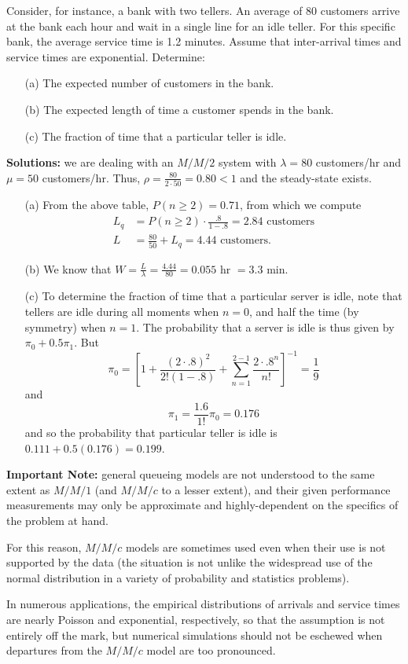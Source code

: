 \begin{Example} Consider, for instance, a bank with two tellers. An average of 80 customers arrive at the bank each hour and wait in a single line for an idle teller. For this specific bank, the average service time is 1.2 minutes. Assume that inter-arrival times and service times are exponential. Determine:
\begin{itemize}[noitemsep]
	\item[(a)] The expected number of customers in the bank.
	\item[(b)] The expected length of time a customer spends in the bank.
	\item[(c)] The fraction of time that a particular teller is idle.
\end{itemize}
\textbf{Solutions:} we are dealing with an $M/M/2$ system with $\lambda =80 $ customers/hr and $\mu = 50$ customers/hr. Thus, $\rho = \frac{80}{2\cdot 50} = 0.80 < 1$ and the steady-state exists. 
\begin{itemize}[noitemsep]
	\item[(a)]  From the above table, $P(n \geq 2) = 0.71$, from which we compute 
\begin{align*} L_{q} &= P( n \geq 2)\cdot \frac{.8}{1-.8} = 2.84 \text{ customers}\\
L& = 	\frac{80}{50} + L_{q}	= 4.44 \text{ customers.} \end{align*}
\item[(b)]	We know that $W = \frac{L}{\lambda} = \frac{4.44}{80} = 0.055 \text{ hr }= 3.3 $ min.
\item[(c)] To determine the fraction of time that a particular server is idle, note that tellers are idle during all moments when $n=0 $, and half the time (by symmetry) when $n = 1$. The probability that a server is idle is thus given by $ \pi_{0} + 0.5 \pi_{1}$. But
 $$\pi_{0} = \left[1 + \frac{\left(2\cdot .8\right)^{2}}{2! \left(1-.8\right)} + \sum^{2-1}_{n=1} \frac{2\cdot .8^{n}}{n!}\right]^{-1}= \frac{1}{9}$$ and $$\pi_{1} = \frac{1.6}{1!} \pi_{0} = 0.176$$ and so the probability that particular teller is idle is $0.111 + 0.5(0.176) = 0.199$.
\end{itemize}
\end{Example}
\noindent \textbf{Important Note:} general queueing models are not understood to the same extent as $M/M/1$ (and $M/M/c$ to a lesser extent), and their given performance measurements may only be approximate and highly-dependent on the specifics of the problem at hand. \par For this reason, $M/M/c$ models are sometimes used even when their use is not supported by the data (the situation is not unlike the widespread use of the normal distribution in a variety of probability and statistics problems). \par In numerous applications, the empirical distributions of arrivals and service times are nearly Poisson and exponential, respectively, so that the assumption is not entirely off the mark, but numerical simulations should not be eschewed when departures from the $M/M/c$ model are too pronounced.\vfill